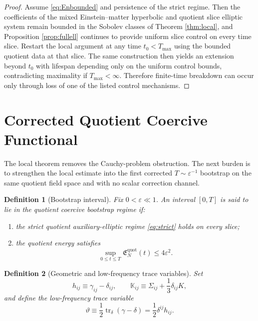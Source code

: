 \documentclass[11pt]{article}
\newtheorem{definition}{Definition}
\begin{document}
\begin{proof}
Assume \eqref{eq:Enbounded} and persistence of the strict regime. Then the coefficients of the mixed Einstein--matter hyperbolic and quotient slice elliptic system remain bounded in the Sobolev classes of Theorem \ref{thm:local}, and Proposition \ref{prop:fullell} continues to provide uniform slice control on every time slice. Restart the local argument at any time \(t_0<T_{\max}\) using the bounded quotient data at that slice. The same construction then yields an extension beyond \(t_0\) with lifespan depending only on the uniform control bounds, contradicting maximality if \(T_{\max}<\infty\). Therefore finite-time breakdown can occur only through loss of one of the listed control mechanisms.
\end{proof}

\section{Corrected Quotient Coercive Functional}

The local theorem removes the Cauchy-problem obstruction. The next burden is to strengthen the local estimate into the first corrected \(T\sim\varepsilon^{-1}\) bootstrap on the same quotient field space and with no scalar correction channel.

\begin{definition}[Bootstrap interval]
\label{def:boot}
Fix \(0<\varepsilon\ll 1\). An interval \([0,T]\) is said to lie in the \emph{quotient coercive bootstrap regime} if:
\begin{enumerate}
    \item the strict quotient auxiliary-elliptic regime \eqref{eq:strict} holds on every slice;
    \item the quotient energy satisfies
    \begin{equation}
    \sup_{0\le t\le T}\mathfrak E_N^{\mathrm{quot}}(t)\le 4\varepsilon^2.
    \label{eq:bootenergy}
    \end{equation}
\end{enumerate}
\end{definition}

\begin{definition}[Geometric and low-frequency trace variables]
\label{def:trace}
Set
\begin{equation}
h_{ij}\equiv \gamma_{ij}-\delta_{ij},
\qquad
\mathbb K_{ij}\equiv \Sigma_{ij}+\frac13\delta_{ij}K,
\label{eq:hk}
\end{equation}
and define the low-frequency trace variable
\begin{equation}
\vartheta
\equiv
\frac12\operatorname{tr}_\delta(\gamma-\delta)
=
\frac12\delta^{ij}h_{ij}.
\label{eq:vartheta}
\end{equation}
\end{definition}
\end{document}
